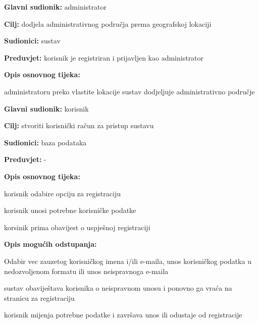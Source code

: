 \begin{packed_item}
	\item \textbf{Glavni sudionik: }administrator
	\item  \textbf{Cilj:} dodjela administrativnog područja prema geografskoj lokaciji
	\item  \textbf{Sudionici:} sustav
	\item  \textbf{Preduvjet:} korisnik je registriran i prijavljen kao administrator
	\item  \textbf{Opis osnovnog tijeka:}
	
	\item[] \begin{packed_enum}
		
		\item administratoru preko vlastite lokacije sustav dodjeljuje administrativno područje
	\end{packed_enum}
\end{packed_item}
\noindent {}
\begin{packed_item}
	\item \textbf{Glavni sudionik: }korisnik
	\item  \textbf{Cilj:} stvoriti korisnički račun za pristup sustavu
	\item  \textbf{Sudionici:} baza podataka
	\item  \textbf{Preduvjet:} -
	\item  \textbf{Opis osnovnog tijeka:}
	
	\item[] \begin{packed_enum}
		
		\item korisnik odabire opciju za registraciju
		\item korisnik unosi potrebne korisničke podatke
		\item korsinik prima obavijest o uspješnoj registraciji
	\end{packed_enum}
	
	\item  \textbf{Opis mogućih odstupanja:}
	
	\item[] \begin{packed_item}
		
		\item[2.a] Odabir vec zauzetog korisničkog imena i/ili e-maila, unos korisničkog podatka u nedozvoljenom formatu ili unos neispravnoga e-maila 
		\item[] \begin{packed_enum}
			
			\item sustav obaviještava korisnika o neispravnom unosu i ponovno ga vraća na stranicu za registraciju
			\item korisnik mijenja potrebne podatke i završava unos ili odustaje od registracije
			
		\end{packed_enum}
	\end{packed_item}
\end{packed_item}



